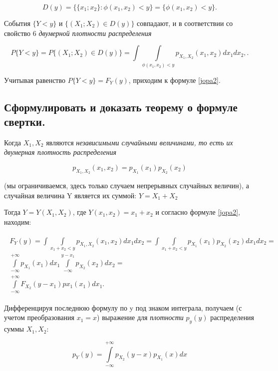 \begin{equation}
	D(y) = \{\{x_1; x_2\} : \phi(x_1, x_2) < y\} = \{\phi(x_1, x_2) < y\}.
\end{equation}

События $\{Y < y\}$ и $\{(X_1; X_2) \in D(y)\}$ совпадают, и в соответствии со свойство 6 \textit{двумерной плотности распределения}

\begin{equation}
	P\{Y < y\} = P\{(X_1; X_2) \in D(y)\} = \int\int\limits_{\phi(x_1, x_2) < y} p_{X_1, X_2}(x_1, x_2)dx_1dx_2,.
\end{equation}

Учитывая равенство $P\{Y < y\} = 	F_Y(y)$, приходим к формуле \ref{jopa2}.

\subsection{Сформулировать и доказать теорему о формуле свертки.}

Когда $X_1, X_2$ являются \textit{независимыми случайными величинами, то есть их двумерная плотность распределения}

\begin{equation}
	p_{X_1, X_2}(x_1, x_2) = p_{X_1}(x_1)p_{X_2}(x_2)
\end{equation}

(мы ограничиваемся, здесь только случаем непрерывных случайных величин), а случайная величина Y является их суммой: $Y = X_1 + X_2$

Тогда $Y = Y(X_1, X_2)$, где $Y(x_1, x_2) = x_1 + x_2$ и согласно формуле \ref{jopa2}, находим:

\begin{align}
	\begin{split}
	F_Y(y) = \int\int\limits_{x_1 + x_2 < y} p_{X_1, X_2}(x_1, x_2)dx_1dx_2 =  \int\int\limits_{x_1 + x_2 < y} p_{X_1}(x_1) p_{X_2}(x_2)dx_1dx_2 =\\ \int\limits_{-\infty}^{+\infty} p_{X_1}(x_1)dx_1 \int\limits_{-\infty}^{y-x_1} p_{X_2}(x_2)dx_2 = \\
	\int\limits_{-\infty}^{+\infty}F_{X_2}(y-x_1)px_1(x_1)dx_1.
	\end{split}
\end{align}

Дифференцируя последнюю формулу по y под знаком интеграла, получаем (с учетом преобразования $x_1 = x$) выражение для \textit{плотности} $p_y(y)$  распределения суммы $X_1, X_2:$ 

\begin{equation}
	p_Y(y) = \int\limits_{-\infty}^{+\infty}p_{X_2}(y - x)p_{X_1}(x)dx
\end{equation}

